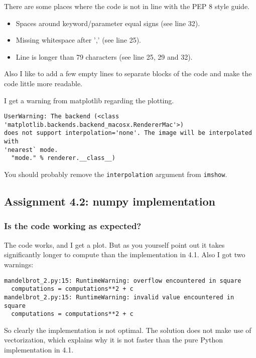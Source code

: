 \documentclass[a4paper]{article}
\begin{document}
There are some places where the code is not in line with the PEP 8 style guide.

\begin{itemize}
    \item Spaces around keyword/parameter equal signs (see line 32).
    \item Missing whitespace after ',' (see line 25).
    \item Line is longer than 79 characters (see line 25, 29 and 32).
\end{itemize}

Also I like to add a few empty lines to separate blocks of the code and make the code little more readable.

I get a warning from matplotlib regarding the plotting.

\begin{verbatim}
UserWarning: The backend (<class 'matplotlib.backends.backend_macosx.RendererMac'>)
does not support interpolation='none'. The image will be interpolated with
'nearest` mode.
  "mode." % renderer.__class__)
\end{verbatim}

You should probably remove the \texttt{interpolation} argument from \texttt{imshow}.






\subsection*{Assignment 4.2:  numpy implementation} \label{sec:assignment5.2}


\subsubsection*{Is the code working as expected?}

The code works, and I get a plot. But as you yourself point out it takes significantly longer to compute than the implementation in 4.1. Also I got two warnings:

\begin{verbatim}
mandelbrot_2.py:15: RuntimeWarning: overflow encountered in square
  computations = computations**2 + c
mandelbrot_2.py:15: RuntimeWarning: invalid value encountered in square
  computations = computations**2 + c
\end{verbatim}

So clearly the implementation is not optimal. The solution does not make use of vectorization, which explains why it is not faster than the pure Python implementation in 4.1.
\end{document}
